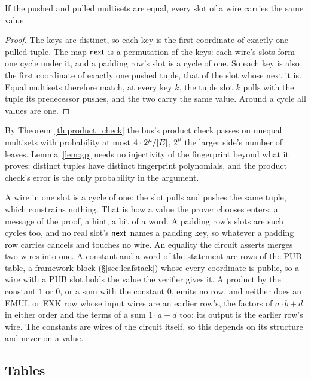 \begin{lemma}\label{lem:rec-cycles}
If the pushed and pulled multisets are equal, every slot of a wire carries the same value.
\end{lemma}
\begin{proof}
The keys are distinct, so each key is the first coordinate of exactly one pulled tuple. The map $\mathsf{next}$ is a permutation of the keys: each wire's slots form one cycle under it, and a padding row's slot is a cycle of one. So each key is also the first coordinate of exactly one pushed tuple, that of the slot whose next it is. Equal multisets therefore match, at every key $k$, the tuple slot $k$ pulls with the tuple its predecessor pushes, and the two carry the same value. Around a cycle all values are one.
\end{proof}

By Theorem~\ref{th:product_check} the bus's product check passes on unequal multisets with probability at most $4\cdot2^{\mu}/|E|$, $2^{\mu}$ the larger side's number of leaves. Lemma~\ref{lem:gp} needs no injectivity of the fingerprint beyond what it proves: distinct tuples have distinct fingerprint polynomials, and the product check's error is the only probability in the argument.

A wire in one slot is a cycle of one: the slot pulls and pushes the same tuple, which constrains nothing. That is how a value the prover chooses enters: a message of the proof, a hint, a bit of a word. A padding row's slots are such cycles too, and no real slot's $\mathsf{next}$ names a padding key, so whatever a padding row carries cancels and touches no wire. An equality the circuit asserts merges two wires into one. A constant and a word of the statement are rows of the \textsf{PUB} table, a framework block (\S\ref{sec:leafstack}) whose every coordinate is public, so a wire with a \textsf{PUB} slot holds the value the verifier gives it. A product by the constant $1$ or $0$, or a sum with the constant $0$, emits no row, and neither does an \textsf{EMUL} or \textsf{EXK} row whose input wires are an earlier row's, the factors of $a\cdot b+d$ in either order and the terms of a sum $1\cdot a+d$ too: its output is the earlier row's wire. The constants are wires of the circuit itself, so this depends on its structure and never on a value.

\subsection{Tables}\label{rec:tables}

